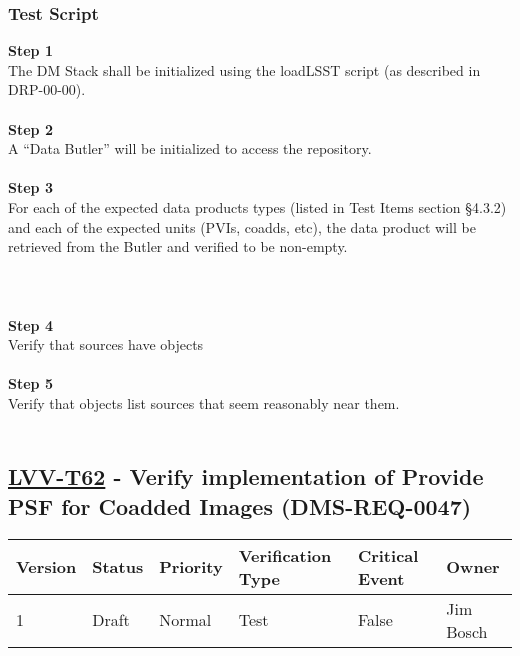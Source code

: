\hypertarget{test-script-38}{%
\subsubsection{Test Script}\label{test-script-38}}

\textbf{Step 1}\\
The DM Stack shall be initialized using the loadLSST script (as
described in DRP-00-00).\\
~\\
\textbf{Step 2}\\
A ``Data Butler'' will be initialized to access the repository.\\
~\\
\textbf{Step 3}\\
For each of the expected data products types (listed in Test Items
section §4.3.2) and each of the expected units (PVIs, coadds, etc), the
data product will be retrieved from the Butler and verified to be
non-empty.\\
~\\
~\\
~\\
\textbf{Step 4}\\
Verify that sources have objects\\
~\\
\textbf{Step 5}\\
Verify that objects list sources that seem reasonably near them.\\
~\\

\hypertarget{lvv-t62---verify-implementation-of-provide-psf-for-coadded-images-dms-req-0047}{%
\subsection{\texorpdfstring{\href{https://jira.lsstcorp.org/secure/Tests.jspa\#/testCase/LVV-T62}{LVV-T62}
- Verify implementation of Provide PSF for Coadded Images
(DMS-REQ-0047)}{LVV-T62 - Verify implementation of Provide PSF for Coadded Images (DMS-REQ-0047)}}\label{lvv-t62---verify-implementation-of-provide-psf-for-coadded-images-dms-req-0047}}

\begin{longtable}[]{@{}llllll@{}}
\toprule
Version & Status & Priority & Verification Type & Critical Event &
Owner\tabularnewline
\midrule
\endhead
1 & Draft & Normal & Test & False & Jim Bosch\tabularnewline
\bottomrule
\end{longtable}

